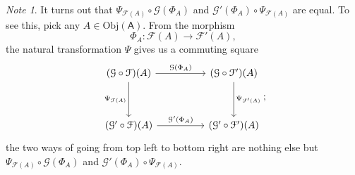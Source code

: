 \documentclass[a4paper]{report}
\newcommand{\Obj}{\mathrm{Obj}}
\theoremstyle{definition}
\theoremstyle{plain}
\theoremstyle{remark}
\newtheorem{note}{Note}[section]
\begin{document}
\begin{note}
  It turns out that $\Psi_{\mathcal{F}(A)} \circ \mathcal{G}(\Phi_{A})$ and $\mathcal{G}'(\Phi_{A}) \circ \Psi_{\mathcal{F}(A)}$ are equal. To see this, pick any $A \in \Obj(\mathsf{A})$. From the morphism
  \begin{equation*}
    \Phi_{A}\colon \mathcal{F}(A) \to \mathcal{F}'(A),
  \end{equation*}
  the natural transformation $\Psi$ gives us a commuting square
  \begin{equation*}
    \begin{tikzcd}[row sep=huge, column sep=huge]
      (\mathcal{G} \circ \mathcal{F})(A)
      \arrow[r, "\mathcal{G}(\Phi_{A})"]
      \arrow[d, swap, "\Psi_{\mathcal{F}(A)}"]
      & (\mathcal{G} \circ \mathcal{F}')(A)
      \arrow[d, "\Psi_{\mathcal{F}'(A)}"]
      \\
      (\mathcal{G}' \circ \mathcal{F})(A)
      \arrow[r, "\mathcal{G}'(\Phi_{A})"]
      & (\mathcal{G}' \circ \mathcal{F}')(A)
    \end{tikzcd};
  \end{equation*}
  the two ways of going from top left to bottom right are nothing else but $\Psi_{\mathcal{F}(A)} \circ \mathcal{G}(\Phi_{A})$ and $\mathcal{G}'(\Phi_{A}) \circ \Psi_{\mathcal{F}(A)}$.
\end{note}
\end{document}
